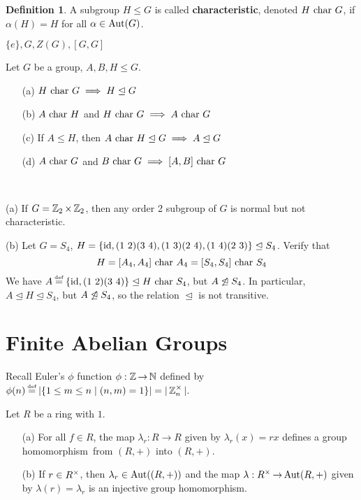 \documentclass[11pt]{book}
\theoremstyle{definition}   \newtheorem{defn}[counter]{Definition} %
\newcommand{\nsg}{\mathrel{\unlhd}}   \newcommand{\ind}{\parindent24pt}   \newcommand{\vn}{\varnothing}
\newcommand\myeq{\mathrel{\overset{\makebox[0pt]{\mbox{\normalfont\tiny\sffamily \textrm{def}}}}{=}}}
\newcommand{\hm}{homomorphism}   \newcommand{\hms}{homomorphisms}   \newcommand{\iso}{isomorphism}
\DeclareMathOperator{\ra}{\rightarrow}   \DeclareMathOperator{\Poly}{\mathbf{P}}   \DeclareMathOperator{\spn}{\textnormal{span}}   \DeclareMathOperator{\aut}{\textnormal{Aut}}
\newcommand{\vs}{\vspace{8pt}}
\numberwithin{counter}{chapter}
\begin{document}
\vs

\begin{defn}
A subgroup $H \leq G$ is called \textbf{characteristic}, denoted $H \textnormal{ char } G$, if $\alpha(H) = H$ for all $\alpha \in \aut(G)$.
\end{defn}

\vs

\begin{example*}
$\{e\},G,Z(G),[G,G]$
\end{example*}

\vs

\begin{lemma}
Let $G$ be a group, $A,B,H \leq G$.
\begin{enumerate}
\item[(a)] $H \car G \implies H \nsg G$
\item[(b)] $A \textnormal{ char } H$ and $H \textnormal{ char } G \implies A \textnormal{ char } G$
\item[(c)] If $A \leq H$, then $A \car H \nsg G \implies A \nsg G$
\item[(d)] $A \textnormal{ char } G$ and $B \textnormal{ char } G \implies [A,B] \textnormal{ char } G$
\end{enumerate}
\end{lemma}

\vs

\begin{example}\
\item[(a)] If $G = \operatorname{\mathbb{Z}}_2 \times \operatorname{\mathbb{Z}}_2$, then any order 2 subgroup of $G$ is normal but not characteristic.
\item[(b)] Let $G = S_4$, $H = \{\id,(1\ 2)(3\ 4),(1\ 3)(2\ 4),(1\ 4)(2\ 3)\} \nsg S_4$. Verify that
	\[H = [A_4,A_4] \textnormal{ char } A_4 = [S_4,S_4] \textnormal{ char } S_4\]
We have $A \myeq \{\id,(1\ 2)(3\ 4)\} \nsg H \car S_4$, but $A \not\nsg S_4$. In particular, $A \nsg H \nsg S_4$, but $A \not\nsg S_4$, so the relation $\nsg$ is not transitive.
\end{example}

\chapter{Finite Abelian Groups}

\vs

Recall Euler's $\phi$ function $\phi : \z \ra \N$ defined by $\phi(n) \myeq |\{1 \leq m \leq n \mid (n,m) = 1\}| = |\z_n\x|$.

\vs

\begin{lemma}
Let $R$ be a ring with $1$.
	\begin{enumerate}
	\item[(a)] For all $f \in R$, the map $\lambda_r : R \ra R$ given by $\lambda_r(x) = rx$ defines a group \hm\ from $(R,+)$ into $(R,+)$.
	\item[(b)] If $r \in R^{\times}$, then $\lambda_r \in \aut((R,+))$ and the map $\lambda : R\x \ra \aut(R,+)$ given by $\lambda(r) = \lambda_r$ is an injective group \hm.
	\end{enumerate}
\end{lemma}
\end{document}
